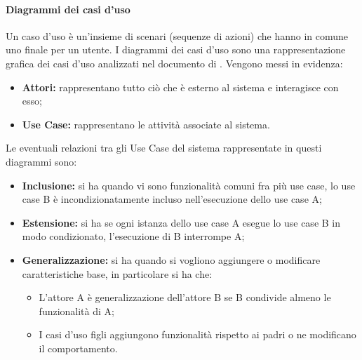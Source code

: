 \paragraph*{Diagrammi dei casi d'uso}
Un caso d'uso è un'insieme di scenari (sequenze di azioni) che hanno in comune uno finale per un utente. I diagrammi dei casi d'uso sono una rappresentazione grafica dei casi d'uso analizzati nel documento di \AdRv. Vengono messi in evidenza:
\begin{itemize}
	\item \textbf{Attori:} rappresentano tutto ciò che è esterno al sistema e interagisce con esso;
	\item \textbf{Use Case:} rappresentano le attività associate al sistema.
\end{itemize}
Le eventuali relazioni tra gli Use Case del sistema rappresentate in questi diagrammi sono: 
\begin{itemize}
	\item \textbf{Inclusione:} si ha quando vi sono funzionalità comuni fra più use case, lo use case B è incondizionatamente incluso nell'esecuzione dello use case A;
	\item \textbf{Estensione:} si ha se ogni istanza dello use case A esegue lo use case B in modo condizionato, l'esecuzione di B interrompe A;
	\item \textbf{Generalizzazione:} si ha quando si vogliono aggiungere o modificare caratteristiche base, in particolare si ha che:
	\begin{itemize}
		\item L'attore A è generalizzazione dell'attore B se B condivide almeno le funzionalità di A;
		\item I casi d'uso figli aggiungono funzionalità rispetto ai padri o ne modificano il comportamento.
	\end{itemize}
\end{itemize} 



